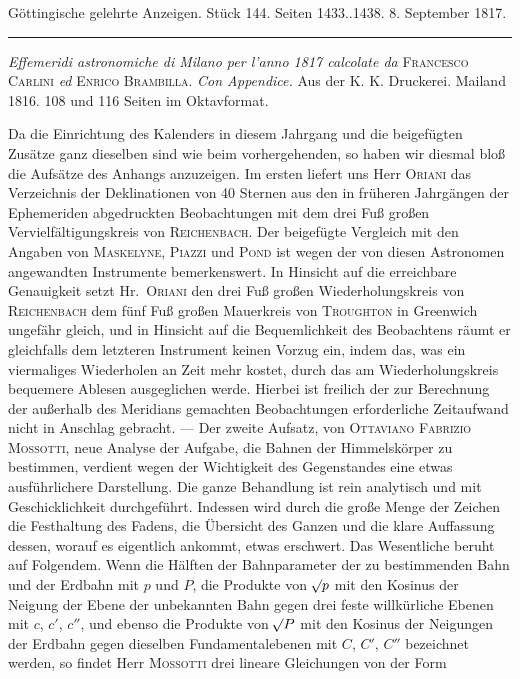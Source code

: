 \clearpage
{}
\hypertarget{native-606-lower}{}
\begin{center}\small Göttingische gelehrte Anzeigen. Stück 144. Seiten 1433..1438. 8. September 1817.\\[3pt]\rule{.72\linewidth}{.3pt}\end{center}

{\setlength{\rightskip}{0pt plus 3em}\emph{Effemeridi astronomiche di Milano per l'anno \textup{1817} calcolate da} \textsc{Francesco Carlini} \emph{ed} \textsc{Enrico Brambilla}. \emph{Con Appendice.} Aus der K. K. Druckerei. Mailand 1816. 108 und 116 Seiten im Oktavformat.\par}

\begingroup{}\relax
Da die Einrichtung des Kalenders in diesem Jahrgang und die beigefügten Zusätze ganz dieselben sind wie beim vorhergehenden, so haben wir diesmal bloß die Aufsätze des Anhangs anzuzeigen. Im ersten liefert uns Herr \textsc{Oriani} das Verzeichnis der Deklinationen von 40 Sternen aus den in früheren Jahrgängen der Ephemeriden abgedruckten Beobachtungen mit dem drei Fuß großen Vervielfältigungskreis von \textsc{Reichenbach}. Der beigefügte Vergleich mit den Angaben von \textsc{Maskelyne}, \textsc{Piazzi} und \textsc{Pond} ist wegen der von diesen Astronomen angewandten Instrumente bemerkenswert. In Hinsicht auf die erreichbare Genauigkeit setzt Hr.\ \textsc{Oriani} den drei Fuß großen Wiederholungskreis von \textsc{Reichenbach} dem fünf Fuß großen Mauerkreis von \textsc{Troughton} in Greenwich ungefähr gleich, und in Hinsicht auf die Bequemlichkeit des Beobachtens räumt er gleichfalls dem letzteren Instrument keinen Vorzug ein, indem das, was ein viermaliges Wiederholen an Zeit mehr kostet, durch das am Wiederholungskreis bequemere Ablesen ausgeglichen werde. Hierbei ist freilich der zur Berechnung der außerhalb des Meridians gemachten Beobachtungen erforderliche Zeitaufwand nicht in Anschlag gebracht. --- Der zweite Aufsatz, von \textsc{Ottaviano Fabrizio Mossotti}, neue Analyse der Aufgabe, die Bahnen der Himmelskörper zu bestimmen, verdient wegen der Wichtigkeit des Gegenstandes eine etwas ausführlichere Darstellung. Die ganze Behandlung ist rein analytisch und mit Geschicklichkeit durchgeführt. Indessen wird durch die große Menge der Zeichen die Festhaltung des Fadens, die Übersicht des Ganzen und die klare Auffassung dessen, worauf es eigentlich ankommt, etwas erschwert. Das Wesentliche beruht auf Folgendem. Wenn die Hälften der Bahnparameter der zu bestimmenden Bahn und der Erdbahn mit $p$ und $P$, die Produkte von $\mathord{{}^{}\!\surd}p$ mit den Kosinus der Neigung der Ebene der unbekannten Bahn gegen drei feste willkürliche Ebenen mit $c$, $c'$, $c''$, und ebenso die Produkte von $\mathord{{}^{}\!\surd}P$ mit den Kosinus der Neigungen der Erdbahn gegen dieselben Fundamentalebenen mit $C$, $C'$, $C''$ bezeichnet werden, so findet Herr \textsc{Mossotti} drei lineare Gleichungen von der Form
